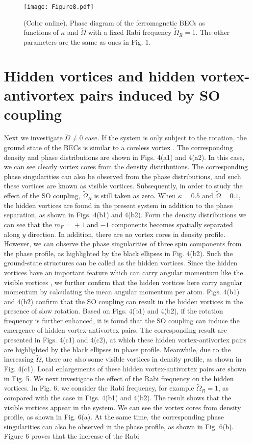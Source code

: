 \documentclass[aps,pra,showpacs,twocolumn,superscriptaddress]{revtex4-1}
\begin{document}
\begin{figure}
\texttt{[image: Figure8.pdf]}
\caption{(Color online). Phase diagram of the ferromagnetic BECs as functions of $\kappa$ and $\tilde{\Omega}$ with a fixed Rabi frequency $\widetilde{\Omega}_{R}=1$. The other parameters are the same as ones in Fig. 1.} \label{Figure8}
\end{figure}

\section{Hidden vortices and hidden vortex-antivortex pairs induced by SO coupling}
Next we investigate $\tilde{\Omega}\neq0$ case. If the system is only subject to the rotation, the ground state of the BECs is similar to a coreless vortex \cite{Martikainen2002}. The corresponding density and phase distributions are shown in Figs. 4(a1) and 4(a2). In this case, we can see clearly vortex cores from the density distributions. The corresponding phase singularities can also be observed from the phase distributions, and such these vortices are known as visible vortices. Subsequently, in order to study the effect of the SO coupling, $\tilde{\Omega}_{R}$ is still taken as zero. When $\kappa=0.5$ and $\tilde{\Omega}=0.1$, the hidden vortices are found in the present system in addition to the phase separation, as shown in Figs. 4(b1) and 4(b2). Form the density distributions we can see that the $m_{F}\!=\!+1$ and $-1$ components becomes spatially separated along $y$ direction. In addition, there are no vortex cores in density profile. However, we can observe the phase singularities of three spin components from the phase profile, as highlighted by the black ellipses in Fig. 4(b2). Such the ground-state structures can be called as the hidden vortices. Since the hidden vortices have an important feature which can carry angular momentum like the visible vortices \cite{Wen2010,Mithun2014}, we further confirm that the hidden vortices here carry angular momentum by calculating the mean angular momentum per atom. Figs. 4(b1) and 4(b2) confirm that the SO coupling can result in the hidden vortices in the presence of slow rotation. Based on Figs. 4(b1) and 4(b2), if the rotation frequency is further enhanced, it is found that the SO coupling can induce the emergence of hidden vortex-antivortex pairs. The corresponding result are presented in Figs. 4(c1) and 4(c2), at which these hidden vortex-antivortex pairs are highlighted by the black ellipses in phase profile. Meanwhile, due to the increasing $\tilde{\Omega}$, there are also some visible vortices in density profile, as shown in Fig. 4(c1). Local enlargements of these hidden vortex-antivortex pairs are shown in Fig. 5. We next investigate the effect of the Rabi frequency on the hidden vortices. In Fig. 6, we consider the Rabi frequency, for example $\tilde{\Omega}_{R}=1$, as compared with the case in Figs. 4(b1) and 4(b2). The result shows that the visible vortices appear in the system. We can see the vortex cores from density profile, as shown in Fig. 6(a). At the same time, the corresponding phase singularities can also be observed in the phase profile, as shown in Fig. 6(b). Figure 6 proves that the increase of the Rabi 
\end{document}
